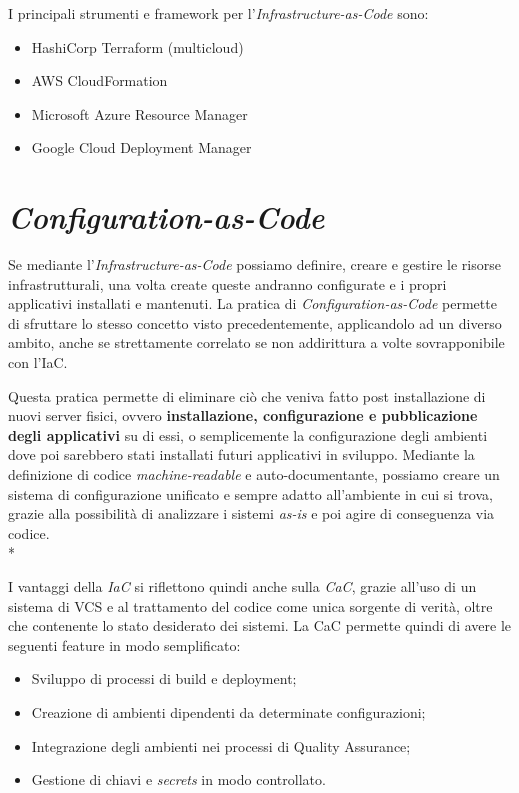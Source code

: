 \documentclass[../main.tex]{subfiles}
\begin{document}
            I principali strumenti e framework per l'\emph{Infrastructure-as-Code} sono:
            \begin{itemize}
                \item HashiCorp Terraform (multicloud)
                \item AWS CloudFormation
                \item Microsoft Azure Resource Manager
                \item Google Cloud Deployment Manager
            \end{itemize}
    
        \section{\emph{Configuration-as-Code}}
        
            Se mediante l'\emph{Infrastructure-as-Code} possiamo definire, creare e gestire le risorse infrastrutturali, una volta create queste andranno configurate e i propri applicativi installati e mantenuti. La pratica di \emph{Configuration-as-Code}\cite{cloud_cac} permette di sfruttare lo stesso concetto visto precedentemente, applicandolo ad un diverso ambito, anche se strettamente correlato se non addirittura a volte sovrapponibile con l'IaC.
            
            Questa pratica permette di eliminare ciò che veniva fatto post installazione di nuovi server fisici, ovvero \textbf{installazione, configurazione e pubblicazione degli applicativi} su di essi, o semplicemente la configurazione degli ambienti dove poi sarebbero stati installati futuri applicativi in sviluppo. Mediante la definizione di codice \emph{machine-readable} e auto-documentante, possiamo creare un sistema di configurazione unificato e sempre adatto all'ambiente in cui si trova, grazie alla possibilità di analizzare i sistemi \emph{as-is} e poi agire di conseguenza via codice.\\*
            
            I vantaggi della \emph{IaC} si riflettono quindi anche sulla \emph{CaC}, grazie all'uso di un sistema di VCS e al trattamento del codice come unica sorgente di verità, oltre che contenente lo stato desiderato dei sistemi. La CaC permette quindi di avere le seguenti feature in modo semplificato:
            \begin{itemize}
                \item Sviluppo di processi di build e deployment;
                \item Creazione di ambienti dipendenti da determinate configurazioni;
                \item Integrazione degli ambienti nei processi di Quality Assurance;
                \item Gestione di chiavi e \emph{secrets} in modo controllato.
            \end{itemize}
            
\end{document}
